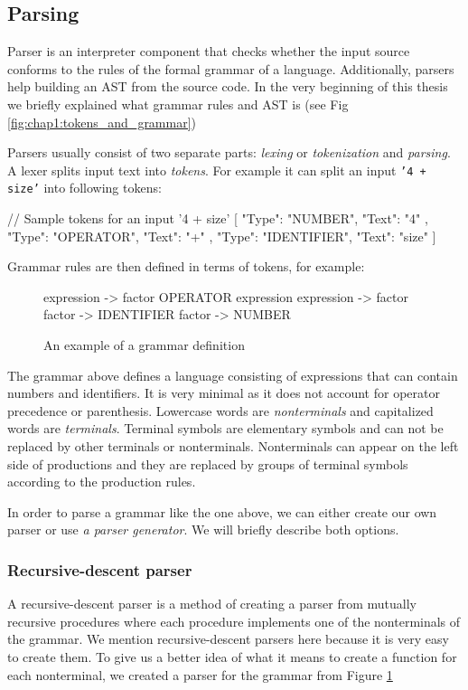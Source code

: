 \subsection{Parsing}
Parser is an interpreter component that checks whether the input source conforms to the rules of the formal grammar of a language. Additionally, parsers help
building an AST from the source code. In the very beginning of this thesis we briefly explained what grammar rules and AST is (see Fig \ref{fig:chap1:tokens_and_grammar})

Parsers usually consist of two separate parts: \emph{lexing} or \emph{tokenization} and \emph{parsing}. A lexer splits input text into \emph{tokens}.
For example it can split an input \texttt{'4 + size'} into following tokens:
\begin{code}
// Sample tokens for an input '4 + size'
[{ "Type": "NUMBER", "Text": "4" },
 { "Type": "OPERATOR", "Text": "+" },
 { "Type": "IDENTIFIER", "Text": "size" }]
\end{code}

Grammar rules are then defined in terms of tokens, for example:
\begin{figure}
    \begin{code}
    expression -> factor OPERATOR expression
    expression -> factor
    factor -> IDENTIFIER
    factor -> NUMBER
    \end{code}
    \caption{An example of a grammar definition}
    \label{fig:chap4:grammar}
\end{figure}

The grammar above defines a language consisting of expressions that can contain numbers and identifiers. It is very minimal as it does not account
for operator precedence or parenthesis. Lowercase words are \emph{nonterminals} and capitalized words are \emph{terminals}. Terminal symbols are elementary
symbols and can not be replaced by other terminals or nonterminals. Nonterminals can appear on the left side of productions and they are replaced by groups
of terminal symbols according to the production rules.

In order to parse a grammar like the one above, we can either create our own parser or use \emph{a parser generator}. We will briefly describe both options.

\subsubsection*{Recursive-descent parser}
A recursive-descent parser is a method of creating a parser from mutually recursive procedures where each procedure implements one of the nonterminals
of the grammar. We mention recursive-descent parsers here because it is very easy to create them. To give us a better idea of what it means to create
a function for each nonterminal, we created a parser for the grammar from Figure \ref{fig:chap4:grammar}

